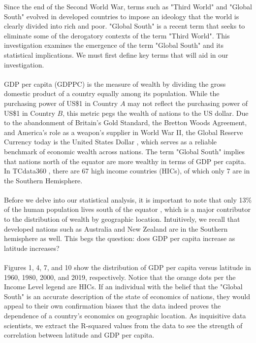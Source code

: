 \documentclass[15pt]{article}
\begin{document}
Since the end of the Second World War, terms such as "Third World" and "Global South" evolved in developed countries to impose an ideology that the world is clearly divided into rich and poor. "Global South" is a recent term that seeks to eliminate some of the derogatory contexts of the term "Third World". This investigation examines the emergence of the term "Global South" and its statistical implications. We must first define key terms that will aid in our investigation.
\\
\\ GDP per capita (GDPPC) is the measure of wealth by dividing the gross domestic product of a country equally among its population. While the purchasing power of US\$1 in Country $A$ may not reflect the purchasing power of US\$1 in Country $B$, this metric pegs the wealth of nations to the US dollar. Due to the abandonment of Britain's Gold Standard, the Bretton Woods Agreement, and America's role as a weapon's supplier in World War II, the Global Reserve Currency today is the United States Dollar \cite{1}, which serves as a reliable benchmark of economic wealth across nations. The term "Global South" implies that nations north of the equator are more wealthy in terms of GDP per capita. In TCdata360 \cite{2}, there are 67 high income countries (HICs), of which only 7 are in the Southern Hemisphere. \\
\\ Before we delve into our statistical analysis, it is important to note that only 13\% of the human population lives south of the equator \cite{3}, which is a major contributor to the distribution of wealth by geographic location. Intuitively, we recall that developed nations such as Australia and New Zealand are in the Southern hemisphere as well. This begs the question: does GDP per capita increase as latitude increases? \\
\\
Figures 1, 4, 7, and 10 show the distribution of GDP per capita versus latitude in 1960, 1980, 2000, and 2019, respectively. Notice that the orange dots per the Income Level legend are HICs. If an individual with the belief that the "Global South" is an accurate description of the state of economics of nations, they would appeal to their own confirmation biases that the data indeed proves the dependence of a country's economics on geographic location. As inquisitive data scientists, we extract the R-squared values from the data to see the strength of correlation between latitude and GDP per capita.\\
\end{document}
